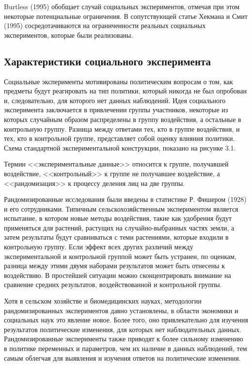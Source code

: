 Burtless (1995) обобщает случай социальных экспериментов, отмечая при этом некоторые потенциальные ограничения. В сопутствующей статье Хекмана и Смит (1995) сосредотачиваются на ограниченности реальных социальных экспериментов, которые были реализованы. 


\subsection{Характеристики социального эксперимента}


Социальные эксперименты мотивированы политическим вопросам о том, как предметы будут реагировать на тип политики, который никогда не был опробован и, следовательно, для которого нет данных наблюдений. Идея социального эксперимента заключается в привлечении группы участников, некоторые из которых случайным образом распределены в группу воздействия, а остальные в контрольную группу. Разница между ответами тех, кто в группе воздействия, и тех, кто в контрольной группе, представляет собой оценку влияния политики. Схема стандартной экспериментальной конструкции,  показано на рисунке 3.1.


Термин <<экспериментальные данные>> относится к группе, получавшей воздействие, <<контрольный>> к группе не получавшее воздействие, а <<рандомизация>> к процессу деления лиц на две группы.


Рандомизированные исследования были введены в статистике Р. Фишером (1928) и его сотрудниками. Типичным сельскохозяйственным экспериментом является испытание, в котором новые методы воздействия, такие как удобрения будут применяться для растений, растущих на случайно-выбранных частях земли, а затем результаты будут сравниваться с теми растениями, которые входили в контрольную группу. Если эффект всех других различий между экспериментальной и контрольной группой может быть устранен, по оценкам, разница между этими двумя наборами результатов может быть отнесены к воздействию. В простейшей ситуации можно сконцентрировать внимание на сравнение средних результатов, воздействованной и контрольной группы.


Хотя в сельском хозяйстве и биомедицинских науках, методологии рандомизированных экспериментов давно установлены, в области экономики и социальных наук это явление новое. Более того, оно привлекательно для изучения результатов политические изменения, для которых нет наблюдательных данных. Рандомизированные эксперименты также приводят к более сильному изменению в политике переменных и параметров, чем их наличие в данных наблюдений, тем самым облегчая для выявления и изучения ответов на политические изменения.


